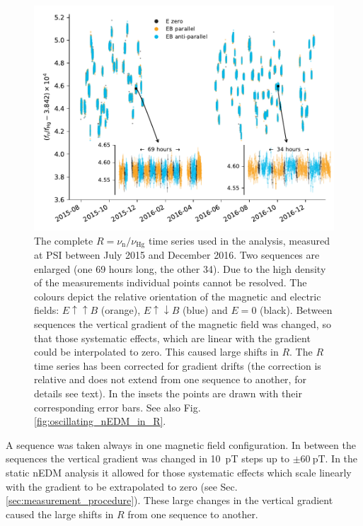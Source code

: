 \begin{figure}
  \centering
  \includegraphics[width=\linewidth]{gfx/axions/deltah4mm_time_domain_inset_no_yerr.pdf}
  \caption{The complete $R = \nu_\text{n} / \nu_\text{Hg}$ time series used in the analysis, measured at PSI between July 2015 and December 2016.
  Two sequences are enlarged (one 69 hours long, the other 34).
  Due to the high density of the measurements individual points cannot be resolved.
  The colours depict the relative orientation of the magnetic and electric fields: $E \uparrow \uparrow B$ (orange), $E \uparrow \downarrow B$ (blue) and $E=0$ (black).
  Between sequences the vertical gradient of the magnetic field was changed, so that those systematic effects, which are linear with the gradient could be interpolated to zero.
  This caused large shifts in $R$.
  The $R$ time series has been corrected for gradient drifts (the correction is relative and does not extend from one sequence to another, for details see text).
  In the insets the points are drawn with their corresponding error bars. See also Fig.\,\ref{fig:oscillating_nEDM_in_R}.}\label{fig:PSI_dataset_time_domain}
\end{figure}

A sequence was taken always in one magnetic field configuration.
In between the sequences the vertical gradient was changed in \SI{10}{\pico\tesla} steps up to $\pm \SI{60}{\pico\tesla}$.
In the static nEDM analysis it allowed for those systematic effects which scale linearly with the gradient to be extrapolated to zero (see Sec.\,\ref{sec:measurement_procedure}).
These large changes in the vertical gradient caused the large shifts in $R$ from one sequence to another.




